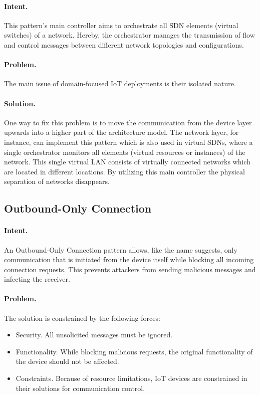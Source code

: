\paragraph{\textbf{Intent.}} This pattern's main controller aims to orchestrate all SDN elements (virtual switches) of a network. Hereby, the orchestrator manages the transmission of flow and control messages between different network topologies and configurations.

\paragraph{\textbf{Problem.}} The main issue of domain-focused IoT deployments is their isolated nature. 

\paragraph{\textbf{Solution.}} One way to fix this problem is to move the communication from the device layer upwards into a higher part of the architecture model. The network layer, for instance, can implement this pattern which is also used in virtual SDNs, where a single orchestrator monitors all elements (virtual resources or instances) of the network. This single virtual LAN consists of virtually connected networks which are located in different locations. By utilizing this main controller the physical separation of networks disappears.


\subsection{Outbound-Only Connection~\cite{Reinfurt20172}} 
\label{p:con}

\paragraph{\textbf{Intent.}} An Outbound-Only Connection pattern allows, like the name suggests, only communication that is initiated from the device itself while blocking all incoming connection requests. This prevents attackers from sending malicious messages and infecting the receiver.

\paragraph{\textbf{Problem.}} The solution is constrained by the following forces:
\begin{itemize}
	\item Security. All unsolicited messages must be ignored.
	\item Functionality. While blocking malicious requests, the original functionality of the device should not be affected. 
	\item Constraints. Because of resource limitations, IoT devices are constrained in their solutions for communication control.
\end{itemize}

